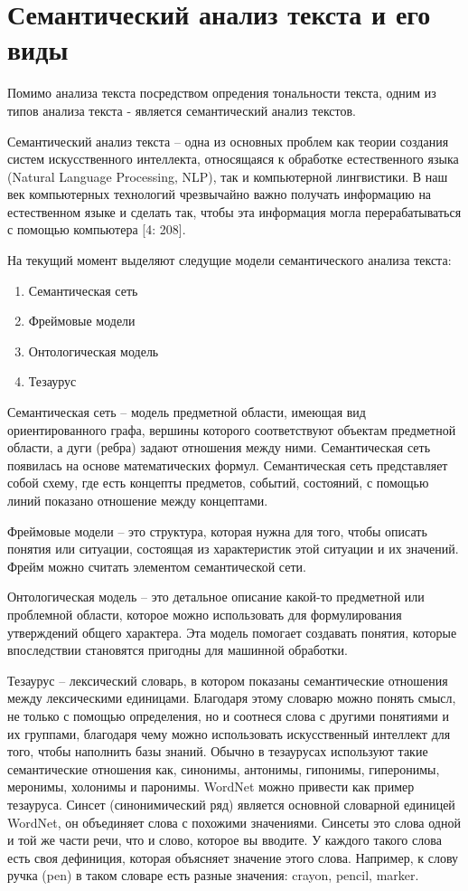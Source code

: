 \section{Семантический анализ текста и его виды}

Помимо анализа текста посредством опредения тональности текста, одним из типов анализа текста - является
семантический анализ текстов.

Семантический анализ текста – одна из основных проблем как 
теории создания систем искусственного интеллекта, относящаяся 
к обработке естественного языка (Natural Language Processing, NLP), так
и компьютерной лингвистики. В наш век компьютерных технологий
чрезвычайно важно получать информацию на естественном языке и
сделать так, чтобы эта информация могла перерабатываться с помощью
компьютера [4: 208]. 

На текущий момент выделяют следущие модели семантического анализа текста:
\begin{enumerate}
  \item Семантическая сеть
  \item Фреймовые модели
  \item Онтологическая модель
  \item Тезаурус 
\end{enumerate}

Семантическая сеть – модель предметной области, имеющая вид
ориентированного графа, вершины которого соответствуют объектам
предметной области, а дуги (ребра) задают отношения между ними.
Семантическая сеть появилась на основе математических формул. Семантическая сеть представляет собой схему, где есть концепты предметов, событий, состояний, с помощью линий показано отношение между
концептами.


Фреймовые модели – это структура, которая нужна для того, чтобы
описать понятия или ситуации, состоящая из характеристик этой ситуации и их значений. Фрейм можно считать элементом семантической
сети.

Онтологическая модель – это детальное описание какой-то предметной или проблемной области, которое можно использовать для
формулирования утверждений общего характера. Эта модель помогает
создавать понятия, которые впоследствии становятся пригодны для машинной обработки.

Тезаурус – лексический словарь, в котором показаны семантические отношения между лексическими единицами.
Благодаря этому словарю можно понять смысл, не только с помощью определения, но и соотнеся слова с другими понятиями и их группами, 
благодаря чему можно использовать искусственный интеллект для того, чтобы наполнить базы знаний. 
Обычно в тезаурусах используют такие семантические
отношения как, синонимы, антонимы, гипонимы, гиперонимы, меронимы, холонимы и паронимы. 
WordNet можно привести как пример тезауруса. 
Синсет (синонимический ряд) является основной словарной единицей WordNet, 
он объединяет слова с похожими значениями. Синсеты
это слова одной и той же части речи, что и слово, которое вы вводите. У
каждого такого слова есть своя дефиниция, которая объясняет значение
этого слова. Например, к слову ручка (pen) в таком словаре есть разные
значения: crayon, pencil, marker.

